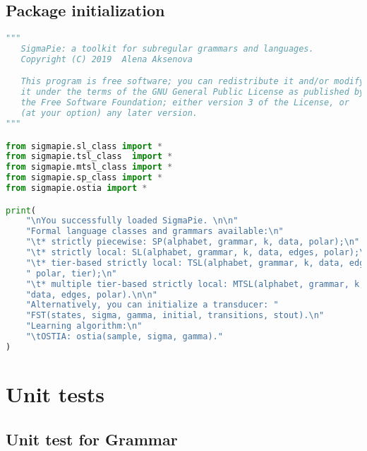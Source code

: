 \section{Package initialization}

\begin{lstlisting}[language=Python]
"""
   SigmaPie: a toolkit for subregular grammars and languages.
   Copyright (C) 2019  Alena Aksenova

   This program is free software; you can redistribute it and/or modify
   it under the terms of the GNU General Public License as published by
   the Free Software Foundation; either version 3 of the License, or
   (at your option) any later version.
"""

from sigmapie.sl_class import *
from sigmapie.tsl_class  import *
from sigmapie.mtsl_class import *
from sigmapie.sp_class import *
from sigmapie.ostia import *

print(
    "\nYou successfully loaded SigmaPie. \n\n"
    "Formal language classes and grammars available:\n"
    "\t* strictly piecewise: SP(alphabet, grammar, k, data, polar);\n"
    "\t* strictly local: SL(alphabet, grammar, k, data, edges, polar);\n"
    "\t* tier-based strictly local: TSL(alphabet, grammar, k, data, edges,"
    " polar, tier);\n"
    "\t* multiple tier-based strictly local: MTSL(alphabet, grammar, k, "
    "data, edges, polar).\n\n"
    "Alternatively, you can initialize a transducer: "
    "FST(states, sigma, gamma, initial, transitions, stout).\n"
    "Learning algorithm:\n"
    "\tOSTIA: ostia(sample, sigma, gamma)."
)
\end{lstlisting}



\chapter{Unit tests}

\section{Unit test for Grammar}

